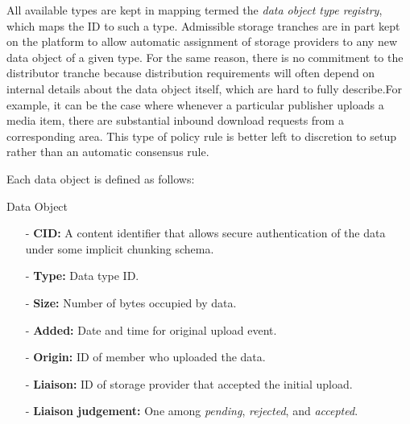 \documentclass{article}
\newenvironment{concept_box}[1]
    {
    \begin{tcolorbox}
    {\large \textbf{#1} }
    }
    {
    \end{tcolorbox}
    }
\begin{document}
All available types are kept in mapping termed the \textit{data object type registry}, which maps the ID to such a type. Admissible storage tranches are in part kept on the platform to allow automatic assignment of storage providers to any new data object of a given type. For the same reason, there is no commitment to the distributor tranche because distribution requirements will often depend on internal details about the data object itself, which are hard to fully describe.For example, it can be the case where whenever a particular publisher uploads a media item, there are substantial inbound download requests from a corresponding area. This type of policy rule is better left to discretion to setup rather than an automatic consensus rule.

Each data object is defined as follows:\\

\begin{concept_box}{Data Object}
\begin{itemize}

  \item[-] \textbf{CID:} A content identifier that allows secure authentication of the data under some implicit chunking schema.

  \item[-] \textbf{Type:} Data type ID.


  \item[-] \textbf{Size:} Number of bytes occupied by data.

  \item[-] \textbf{Added:} Date and time for original upload event.

  \item[-] \textbf{Origin:} ID of member who uploaded the data.

  \item[-] \textbf{Liaison:} ID of storage provider that accepted the initial upload.

  \item[-] \textbf{Liaison judgement:} One among \textit{pending}, \textit{rejected}, and \textit{accepted}.

\end{itemize}

\end{concept_box}
\end{document}
